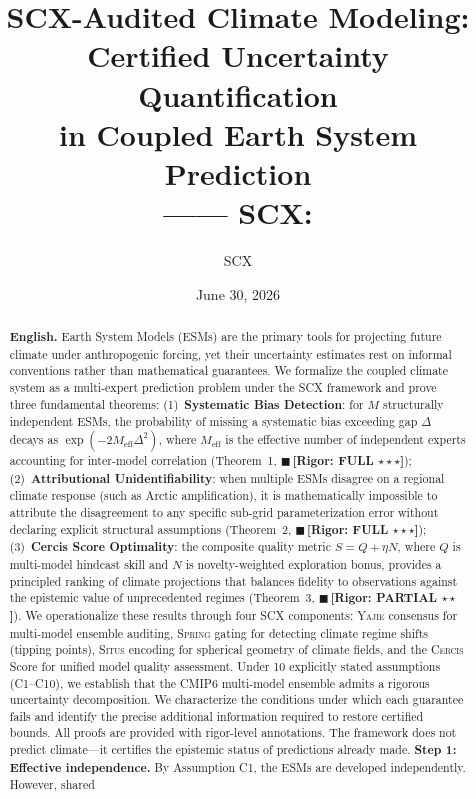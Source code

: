 \documentclass[11pt,a4paper]{article}
\title{\textbf{SCX-Audited Climate Modeling: Certified Uncertainty Quantification\\
       in Coupled Earth System Prediction}\\[4pt]
       {\large —— SCX:}}
\author{SCX}
\date{June 30, 2026}
\theoremstyle{plain}
\theoremstyle{definition}
\theoremstyle{remark}
\newcommand{\rigorFull}{{\color{rigorFull}$\blacksquare$\,\textbf{[Rigor: FULL $\star\star\star$]}}}
\newcommand{\rigorPartial}{{\color{rigorPartial}$\blacksquare$\,\textbf{[Rigor: PARTIAL $\star\star\;$]}}}
\newcommand{\Situs}{\textsc{Situs}}
\newcommand{\Yajie}{\textsc{Yajie}}
\newcommand{\Spring}{\textsc{Spring}}
\newcommand{\Cercis}{\textsc{Cercis}}
\begin{document}
\maketitle
\begin{abstract}
\noindent\textbf{English.}
Earth System Models (ESMs) are the primary tools for projecting future climate
under anthropogenic forcing, yet their uncertainty estimates rest on informal
conventions rather than mathematical guarantees. We formalize the coupled
climate system as a multi-expert prediction problem under the SCX framework and
prove three fundamental theorems: (1)~\textbf{Systematic Bias Detection}: for
$M$ structurally independent ESMs, the probability of missing a systematic bias
exceeding gap $\Delta$ decays as $\exp(-2M_{\mathrm{eff}}\Delta^2)$, where
$M_{\mathrm{eff}}$ is the effective number of independent experts accounting for
inter-model correlation (Theorem~1, \rigorFull); (2)~\textbf{Attributional
Unidentifiability}: when multiple ESMs disagree on a regional climate response
(such as Arctic amplification), it is mathematically impossible to attribute
the disagreement to any specific sub-grid parameterization error without
declaring explicit structural assumptions (Theorem~2, \rigorFull);
(3)~\textbf{Cercis Score Optimality}: the composite quality metric
$S = Q + \eta N$, where $Q$ is multi-model hindcast skill and $N$ is
novelty-weighted exploration bonus, provides a principled ranking of climate
projections that balances fidelity to observations against the epistemic value
of unprecedented regimes (Theorem~3, \rigorPartial).
We operationalize these results through four SCX components: \Yajie{} consensus
for multi-model ensemble auditing, \Spring{} gating for detecting climate regime
shifts (tipping points), \Situs{} encoding for spherical geometry of climate
fields, and the \Cercis{} Score for unified model quality assessment. Under
10 explicitly stated assumptions (C1--C10), we establish that the CMIP6
multi-model ensemble admits a rigorous uncertainty decomposition. We
characterize the conditions under which each guarantee fails and identify the
precise additional information required to restore certified bounds. All proofs
are provided with rigor-level annotations. The framework does not predict
climate---it certifies the epistemic status of predictions already made.
\bigskip
\medskip\noindent\textbf{Step 1: Effective independence.}
By Assumption C1, the ESMs are developed independently. However, shared

\end{abstract}
\end{document}
